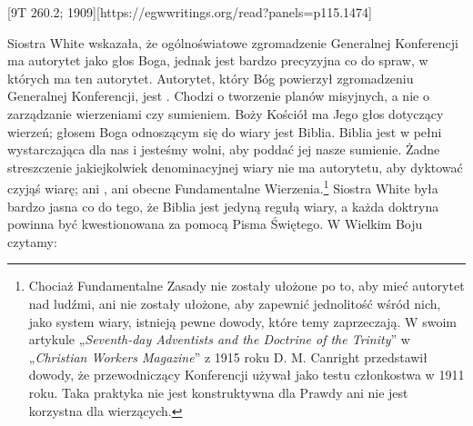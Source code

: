 [9T 260.2; 1909][https://egwwritings.org/read?panels=p115.1474]

Siostra White wskazała, że ogólnoświatowe zgromadzenie Generalnej Konferencji ma autorytet jako głos Boga, jednak jest bardzo precyzyjna co do spraw, w których ma ten autorytet. Autorytet, który Bóg powierzył zgromadzeniu Generalnej Konferencji, jest . Chodzi o tworzenie planów misyjnych, a nie o zarządzanie wierzeniami czy sumieniem. Boży Kościół ma Jego głos dotyczący wierzeń; głosem Boga odnoszącym się do wiary jest Biblia. Biblia jest w pełni wystarczająca dla nas i jesteśmy wolni, aby poddać jej nasze sumienie. Żadne streszczenie jakiejkolwiek denominacyjnej wiary nie ma autorytetu, aby dyktować czyjąś wiarę; ani , ani obecne Fundamentalne Wierzenia.\footnote{Chociaż Fundamentalne Zasady nie zostały ułożone po to, aby mieć autorytet nad ludźmi, ani nie zostały ułożone, aby zapewnić jednolitość wśród nich, jako system wiary, istnieją pewne dowody, które temy zaprzeczają. W swoim artykule „\textit{Seventh-day Adventists and the Doctrine of the Trinity}” w „\textit{Christian Workers Magazine}” z 1915 roku D. M. Canright przedstawił dowody, że przewodniczący Konferencji używał  jako testu członkostwa w 1911 roku. Taka praktyka nie jest konstruktywna dla Prawdy ani nie jest korzystna dla wierzących.} Siostra White była bardzo jasna co do tego, że Biblia jest jedyną regułą wiary, a każda doktryna powinna być kwestionowana za pomocą Pisma Świętego. W Wielkim Boju czytamy:

